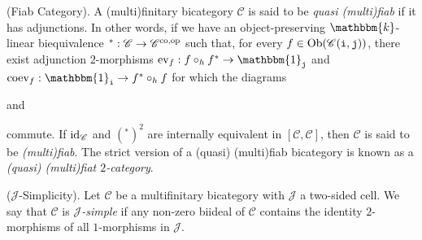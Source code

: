 \noindent\begin{definition}\textup{(Fiab Category).}\label{Fiab} A (multi)finitary bicategory $\mathscr{C}$ is said to be {\em quasi (multi)fiab} if it has adjunctions. In other words, if we have an object-preserving $\mathbbm{k}$-linear biequivalence ${}^* : \mathscr{C} \to \mathscr{C}^\textup{co,op}$ such that, for every $f \in \textnormal{Ob}(\mathscr{C}(\textnormal{\texttt{i}}, \textnormal{\texttt{j}}))$, there exist adjunction $2$-morphisms $\textup{ev}_f : f \circ_h f^* \to \mathbbm{1}_\textobj{j}$ and $\textup{coev}_f : \mathbbm{1}_\textobj{i} \to f^* \circ_h f$ for which the diagrams
\begin{center}
and
\end{center}
\noindent commute. If $\textnormal{id}_\mathscr{C}$ and $({}^*)^2$ are internally equivalent in $[\mathscr{C}, \mathscr{C}]$, then $\mathscr{C}$ is said to be {\em (multi)fiab}. The strict version of a (quasi) (multi)fiab bicategory is known as a {\em (quasi) (multi)fiat $2$-category}.\\
\end{definition}

\noindent\begin{definition}\textup{($\mathcal{J}$-Simplicity).} Let $\mathscr{C}$ be a multifinitary bicategory with $\mathcal{J}$ a two-sided cell. We say that $\mathscr{C}$ is {\em $\mathcal{J}$-simple} if any non-zero biideal of $\mathscr{C}$ contains the identity $2$-morphisms of all $1$-morphisms in $\mathcal{J}$.\\
\end{definition}

